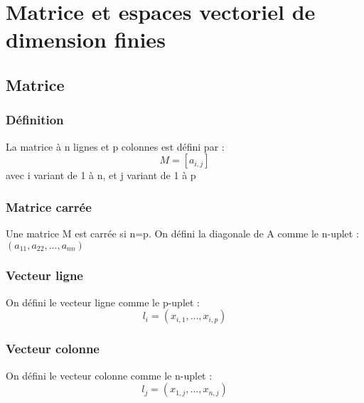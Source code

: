 
\chapter{Matrice et espaces vectoriel de dimension finies}
\section{Matrice}
\subsection{Définition}
\begin{de}
La matrice à n lignes et p colonnes est défini par :
$$M = [a_{i,j}]$$
avec i variant de 1 à n, et j variant de 1 à p
\end{de}
\subsection{Matrice carrée}
\begin{de}
Une matrice M est carrée si n=p. On défini la diagonale de A comme le n-uplet : $(a_{11},a_{22},...,a_{nn})$ 
\end{de}
\subsection{Vecteur ligne}
\begin{de}
On défini le vecteur ligne comme le p-uplet :
$$l_i = (x_{i,1},...,x_{i,p})$$
\end{de}
\subsection{Vecteur colonne}
\begin{de}
On défini le vecteur colonne comme le n-uplet :
$$l_j = (x_{1,j},...,x_{n,j})$$
\end{de}
